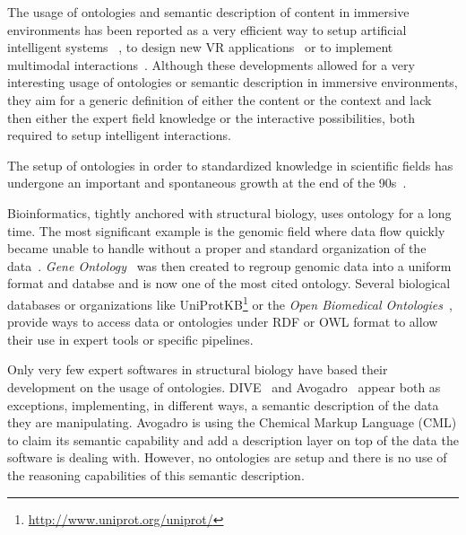 \documentclass{vgtc}                          %
\begin{document}
The usage of ontologies and semantic description of content in immersive environments has been reported as a very efficient way to setup artificial intelligent systems ~\cite{latoschik}, to design new VR applications~\cite{kleinermann2005designing} or to implement multimodal interactions~\cite{irawati2005semantic}. Although these developments allowed for a very interesting usage of ontologies or semantic description in immersive environments, they aim for a generic definition of either the content or the context and lack then either the expert field knowledge or the interactive possibilities, both required to setup intelligent interactions.

The setup of ontologies in order to standardized knowledge in scientific fields has undergone an important and spontaneous growth at the end of the 90s~\cite{schulze-kremer_ontologies_2002, baker_ontology_1999}.

Bioinformatics, tightly anchored with structural biology, uses ontology for a long time. The most significant example is the genomic field where data flow quickly became unable to handle without a proper and standard organization of the data~\cite{schuurman}. \textit{Gene Ontology}~\cite{ashburner} was then created to regroup genomic data into a uniform format and databse and is now one of the most cited ontology. Several biological databases or organizations like UniProtKB\footnote{\url{http://www.uniprot.org/uniprot/}} or the \textit{Open Biomedical Ontologies}~\cite{smith2007obo}, provide ways to access data or ontologies under RDF or OWL format to allow their use in expert tools or specific pipelines.

Only very few expert softwares in structural biology have based their development on the usage of ontologies. DIVE~\cite{rysavy_dive:_2014} and Avogadro~\cite{hanwell2012avogadro} appear both as exceptions, implementing, in different ways, a semantic description of the data they are manipulating. Avogadro is using the Chemical Markup Language (CML) to claim its semantic capability and add a description layer on top of the data the software is dealing with. However, no ontologies are setup and there is no use of the reasoning capabilities of this semantic description. 
\end{document}
